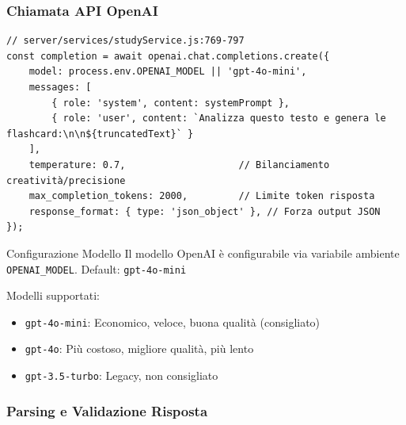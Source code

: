 \documentclass[11pt,a4paper]{article}
\begin{document}
\subsubsection{Chiamata API OpenAI}

\begin{lstlisting}[caption=Chiamata OpenAI Chat Completions]
// server/services/studyService.js:769-797
const completion = await openai.chat.completions.create({
    model: process.env.OPENAI_MODEL || 'gpt-4o-mini',
    messages: [
        { role: 'system', content: systemPrompt },
        { role: 'user', content: `Analizza questo testo e genera le flashcard:\n\n${truncatedText}` }
    ],
    temperature: 0.7,                    // Bilanciamento creatività/precisione
    max_completion_tokens: 2000,         // Limite token risposta
    response_format: { type: 'json_object' }, // Forza output JSON
});
\end{lstlisting}

\begin{importantbox}{Configurazione Modello}
Il modello OpenAI è configurabile via variabile ambiente \texttt{OPENAI\_MODEL}. Default: \texttt{gpt-4o-mini}

Modelli supportati:
\begin{itemize}
    \item \texttt{gpt-4o-mini}: Economico, veloce, buona qualità (consigliato)
    \item \texttt{gpt-4o}: Più costoso, migliore qualità, più lento
    \item \texttt{gpt-3.5-turbo}: Legacy, non consigliato
\end{itemize}
\end{importantbox}

\subsubsection{Parsing e Validazione Risposta}
\end{document}
